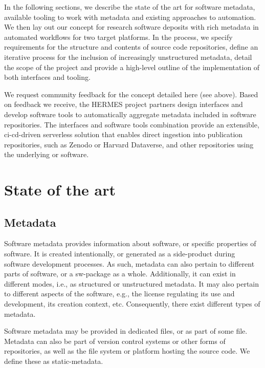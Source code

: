 \documentclass[11pt,a4paper]{scrartcl}
\begin{document}
In the following sections, we describe the state of the art for software metadata, available tooling to work with metadata and existing approaches to automation. We then lay out our concept for research software deposits with rich metadata in automated workflows for two target platforms. In the process, we specify requirements for the structure and contents of source code repositories, define an iterative process for the inclusion of increasingly unstructured metadata, detail the scope of the project and provide a high-level outline of the implementation of both interfaces and tooling. 

We request community feedback for the concept detailed here (see  above). Based on feedback we receive, the HERMES project partners design interfaces and develop software tools to automatically aggregate metadata included in software repositories. The interfaces and software tools combination provide an extensible, \gls{ci-cd}-driven serverless solution that enables direct ingestion into publication repositories, such as Zenodo or Harvard Dataverse, and other repositories using the underlying  or  software. 



\clearpage
\section{State of the art}\label{sec:state-of-the-art}




\subsection{Metadata}\label{subsec:metadata}
Software metadata provides information about software, or specific properties of software. It is created intentionally, or generated as a side-product during software development processes. As such, metadata can also pertain to different parts of software, or a \gls{sw-package} as a whole. Additionally, it can exist in different modes, i.e., as structured or unstructured metadata. It may also pertain to different aspects of the software, e.g., the license regulating its use and development, its creation context, etc. Consequently, there exist different types of metadata.

Software metadata may be provided in dedicated files, or as part of some file. Metadata can also be part of version control systems
or other forms of repositories, as well as the file system or platform hosting the source code. We define these as \gls{static-metadata}.
\end{document}
